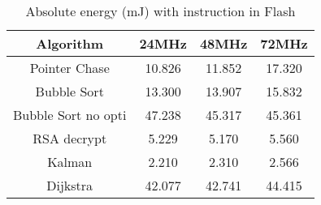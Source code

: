 

\begin{table}
\begin{tabular}{||c c c c||} 
 \hline
 Algorithm & 24MHz & 48MHz & 72MHz \\ [0.5ex] 
 \hline\hline
 Pointer Chase & 10.826 & 11.852 & 17.320 \\ 
 Bubble Sort & 13.300 & 13.907 & 15.832 \\
 Bubble Sort no opti & 47.238 & 45.317 & 45.361 \\
 RSA decrypt & 5.229 & 5.170 & 5.560 \\
 Kalman & 2.210 & 2.310 & 2.566 \\
 Dijkstra & 42.077 & 42.741 & 44.415 \\[1ex] 
 \hline
\end{tabular}
\caption{Absolute energy (mJ) with instruction in Flash}
\label{energy_tab_code_flash}
\end{table}